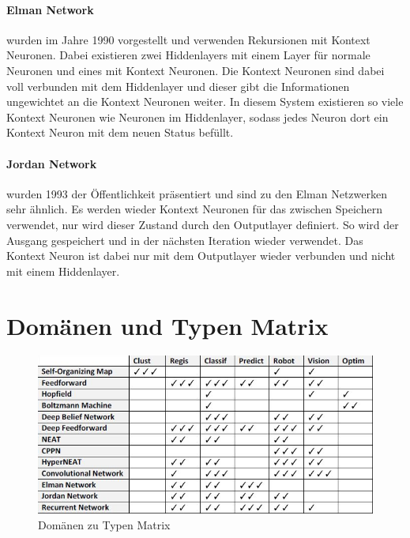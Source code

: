 \paragraph{Elman Network} wurden im Jahre 1990 vorgestellt und verwenden Rekursionen mit Kontext Neuronen. 
Dabei existieren zwei Hiddenlayers mit einem Layer für normale Neuronen und eines mit Kontext Neuronen. 
Die Kontext Neuronen sind dabei voll verbunden mit dem Hiddenlayer und dieser gibt die Informationen ungewichtet an die Kontext Neuronen weiter.
In diesem System existieren so viele Kontext Neuronen wie Neuronen im Hiddenlayer, sodass jedes Neuron dort ein Kontext Neuron mit dem neuen Status befüllt.

\paragraph{Jordan Network} wurden 1993 der Öffentlichkeit präsentiert und sind zu den Elman Netzwerken sehr ähnlich. 
Es werden wieder Kontext Neuronen für das zwischen Speichern verwendet, nur wird dieser Zustand durch den Outputlayer definiert.
So wird der Ausgang gespeichert und in der nächsten Iteration wieder verwendet.
Das Kontext Neuron ist dabei nur mit dem Outputlayer wieder verbunden und nicht mit einem Hiddenlayer.

\section{Domänen und Typen Matrix}

\begin{figure}
	\includegraphics[scale=0.68]{images/typen_domains.png}
	\caption{Domänen zu Typen Matrix \cite{AI3}}
	\label{fig:DomainMatrix}
\end{figure}

